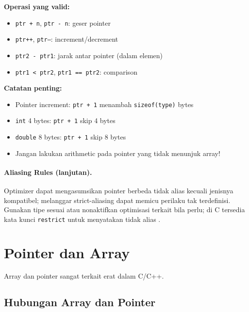 \documentclass[../main.tex]{subfiles}
\begin{document}
\textbf{Operasi yang valid:}
\begin{itemize}
  \item \texttt{ptr + n}, \texttt{ptr - n}: geser pointer
  \item \texttt{ptr++}, \texttt{ptr--}: increment/decrement
  \item \texttt{ptr2 - ptr1}: jarak antar pointer (dalam elemen)
  \item \texttt{ptr1 < ptr2}, \texttt{ptr1 == ptr2}: comparison
\end{itemize}

\textbf{Catatan penting:}
\begin{itemize}
  \item Pointer increment: \texttt{ptr + 1} menambah \texttt{sizeof(type)} bytes
  \item \texttt{int} 4 bytes: \texttt{ptr + 1} skip 4 bytes
  \item \texttt{double} 8 bytes: \texttt{ptr + 1} skip 8 bytes
  \item Jangan lakukan arithmetic pada pointer yang tidak menunjuk array!
\end{itemize}

\paragraph{Aliasing Rules (lanjutan).} Optimizer dapat mengasumsikan pointer berbeda tidak alias kecuali jenisnya kompatibel; melanggar strict-aliasing dapat memicu perilaku tak terdefinisi. Gunakan tipe sesuai atau nonaktifkan optimisasi terkait bila perlu; di C tersedia kata kunci \texttt{restrict} untuk menyatakan tidak alias \parencite{gcc-strict-aliasing,c-restrict}.

\section{Pointer dan Array}

Array dan pointer sangat terkait erat dalam C/C++.

\subsection{Hubungan Array dan Pointer}
\end{document}
